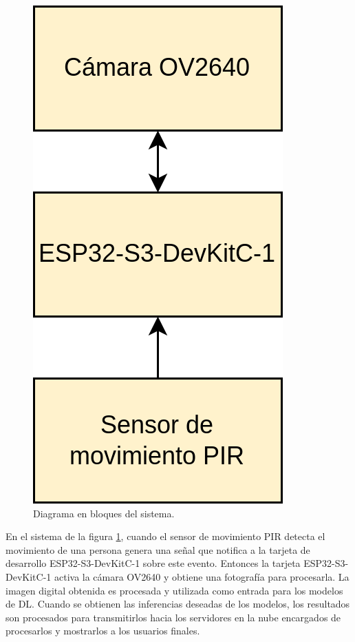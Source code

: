 \begin{figure}[h]
	\centering
	\includegraphics[scale=0.25]{./Figures/sys_blocks.png}
	\caption{Diagrama en bloques del sistema.}
	\label{fig:sys_blocks}
\end{figure}

En el sistema de la figura \ref{fig:sys_blocks}, cuando el sensor de movimiento PIR detecta el movimiento de una persona genera una señal que notifica a la tarjeta de desarrollo ESP32-S3-DevKitC-1 sobre este evento. Entonces la tarjeta ESP32-S3-DevKitC-1 activa la cámara OV2640 y obtiene una fotografía para procesarla. La imagen digital obtenida es procesada y utilizada como entrada para los modelos de DL. Cuando se obtienen las inferencias deseadas de los modelos, los resultados son procesados para transmitirlos hacia los servidores en la nube encargados de procesarlos y mostrarlos a los usuarios finales.


